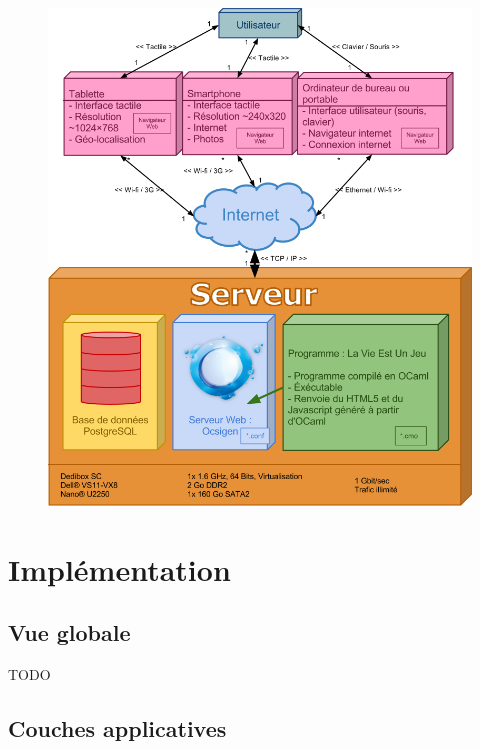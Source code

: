 \documentclass{life-fr}
\begin{document}
\begin{figure}[H]
  \begin{center}
    \includegraphics[width=15cm]{img/deploiement.png}
  \end{center}
\end{figure}



\chapter{Implémentation}
\section{Vue globale}

TODO

\section{Couches applicatives}
\end{document}
